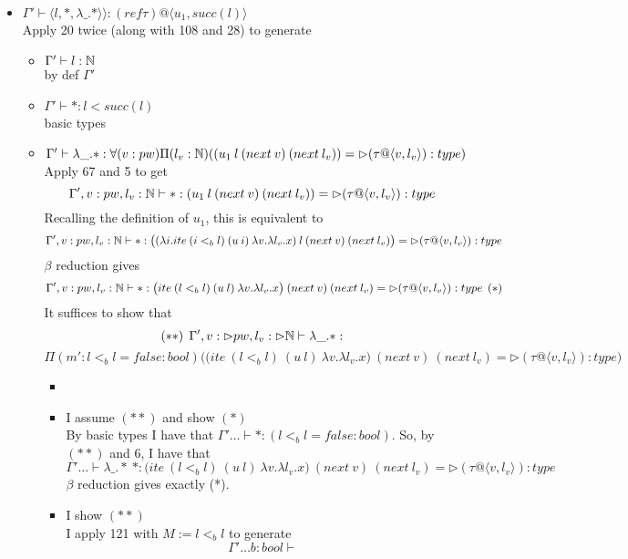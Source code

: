 \message{ !name(paper.tex)}\documentclass{article}
\begin{document}
\begin{itemize}
\begin{itemize}
    \item $\Gamma' \vdash \langle l, *, \lambda \_. *
\rangle \rangle:  (ref \tau)@\langle u_1, succ(l) \rangle$\\
Apply 20 twice (along with 108 and 28) to generate
\begin{itemize}
    \item $\Gamma' \vdash l : \mathbb{N}$\\
by def $\Gamma'$
    \item $\Gamma' \vdash * : l < succ(l)$\\
    basic types
    \item $\Gamma' \vdash  \lambda \_. *
: \forall(v: pw)\Pi(l_v: \mathbb{N})((u_1 \: l \:  (next \:v) \: (next \: l_v)) = \rhd (\tau @ \langle v, l_v \rangle) : type
)$\\
Apply 67 and 5 to get
\[\Gamma', v: pw, l_v: \mathbb{N} \vdash   *
: (u_1 \: l \:  (next \:v) \: (next \: l_v)) = \rhd (\tau @ \langle v, l_v \rangle) : type
\]
Recalling the definition of $u_1$, this is equivalent to 
\[\Gamma', v: pw, l_v: \mathbb{N} \vdash   *
: \big((\lambda i. ite \: (i <_b l) \: (u \: i) \: \lambda v. \lambda l_v. x) \: l \:  (next \:v) \: (next \: l_v)\big) = \rhd (\tau @ \langle v, l_v \rangle) : type
\]
$\beta$ reduction gives 
\[\Gamma', v: pw, l_v: \mathbb{N} \vdash   *
: \big( ite \: (l <_b l) \: (u \: l) \: \lambda v. \lambda l_v. x \big) \:  (next \:v) \: (next \: l_v) = \rhd (\tau @ \langle v, l_v \rangle) : type \:\: (*)
\]
It suffices to show that
     \[(**)\:\: \Gamma', v: \rhd pw, l_v: \rhd \mathbb{N} \vdash  \lambda \_.* :\]
     \[\Pi(m' : l <_b l = false : bool)\Big(\big( ite \: (l <_b l) \: (u \: l) \: \lambda v. \lambda l_v. x \big) \:  (next \:v) \: (next \: l_v) = \rhd (\tau @ \langle v, l_v \rangle) : type \Big) 
     \]
     \begin{itemize}
     \item
     \item I assume $(**)$ and show $(*)$\\
     By basic types I have that $\Gamma' \dots \vdash * :  (l <_b l = false : bool)$. So, by $(**)$ and 6, I have that 
     \[\Gamma' \dots \vdash \lambda \_.* \: * : 
    \big( ite \: (l <_b l) \: (u \: l) \: \lambda v. \lambda l_v. x \big) \:  (next \:v) \: (next \: l_v) = \rhd (\tau @ \langle v, l_v \rangle) : type
     \]
     $\beta$ reduction gives exactly (*).
     \item I show $(**)$\\
  I apply 121 with $M := l <_b l$ to generate\\
  \[\Gamma' \dots b: bool \vdash 
\]
\end{itemize}
\end{itemize}
\end{itemize}
\end{itemize}
\end{document}
